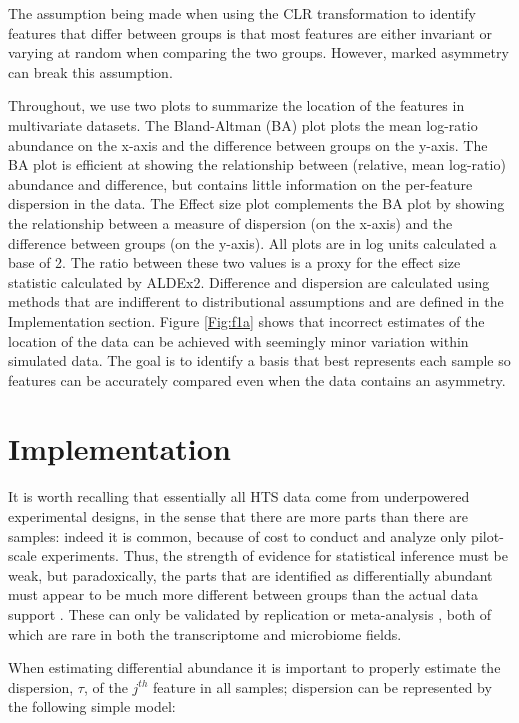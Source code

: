\documentclass{bmcart}
\begin{document}
The assumption being made when using the CLR transformation to identify features that differ between groups is that most features are either invariant or varying at random when comparing the two groups. However, marked asymmetry can break this assumption.


Throughout, we use two plots to summarize the location of the features in multivariate datasets. The Bland-Altman (BA) plot  \cite{altman:1983} plots the mean log-ratio abundance on the x-axis and the difference between groups on the y-axis. The BA plot is efficient at showing the relationship between (relative, mean log-ratio) abundance and difference, but contains little information on the per-feature dispersion in the data. The Effect size plot \cite{Gloor:2015} complements the BA plot by showing the relationship between a measure of dispersion (on the x-axis) and the difference between groups (on the y-axis). All plots are in log units calculated a base of 2. The ratio between these two values is a proxy for the effect size statistic calculated by ALDEx2. Difference and dispersion are calculated using methods that are indifferent to distributional assumptions and are defined in the Implementation section. Figure \ref{Fig:f1a} shows that incorrect estimates of the location of the data can be achieved with seemingly minor variation within simulated data. The goal is to identify a basis that best represents each sample so features can be accurately compared even when the data contains an asymmetry.

\section*{Implementation}


It is worth recalling that essentially all HTS data come from underpowered experimental designs, in the sense that there are more parts than there are samples: indeed it is common, because of cost to conduct and analyze only pilot-scale experiments. Thus, the strength of evidence for statistical inference must be weak, but paradoxically, the parts that are identified as differentially abundant must appear to be much more different between groups than the actual data support  \cite{Halsey:2015aa}. These can only be validated by replication or meta-analysis \cite{Cumming:2008aa}, both of which are rare in both the transcriptome and microbiome fields. 

When estimating differential abundance it is important to properly estimate the dispersion, $\tau$, of the $j^{th}$ feature in all samples; dispersion can be represented by the following simple model:
\end{document}
